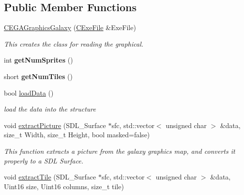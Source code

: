\subsection*{Public Member Functions}
\begin{DoxyCompactItemize}
\item 
\hyperlink{classgalaxy_1_1_c_e_g_a_graphics_galaxy_a76b6bfdad3e6a79bd32a8d588b138bde}{CEGAGraphicsGalaxy} (\hyperlink{class_c_exe_file}{CExeFile} \&ExeFile)
\begin{DoxyCompactList}\small\item\em This creates the class for reading the graphical. \item\end{DoxyCompactList}\item 
\hypertarget{classgalaxy_1_1_c_e_g_a_graphics_galaxy_a81f1beb7b177d2251f9ed48672e2a161}{
int {\bfseries getNumSprites} ()}
\label{classgalaxy_1_1_c_e_g_a_graphics_galaxy_a81f1beb7b177d2251f9ed48672e2a161}

\item 
\hypertarget{classgalaxy_1_1_c_e_g_a_graphics_galaxy_afb2635ebaf2e95319b118c25bca4e175}{
short {\bfseries getNumTiles} ()}
\label{classgalaxy_1_1_c_e_g_a_graphics_galaxy_afb2635ebaf2e95319b118c25bca4e175}

\item 
bool \hyperlink{classgalaxy_1_1_c_e_g_a_graphics_galaxy_ae104cc22b636a84daca1a205277e441f}{loadData} ()
\begin{DoxyCompactList}\small\item\em load the data into the structure \item\end{DoxyCompactList}\item 
\hypertarget{classgalaxy_1_1_c_e_g_a_graphics_galaxy_a4e82fa36e3542e5b3c8db3818a74d22b}{
void \hyperlink{classgalaxy_1_1_c_e_g_a_graphics_galaxy_a4e82fa36e3542e5b3c8db3818a74d22b}{extractPicture} (SDL\_\-Surface $\ast$sfc, std::vector$<$ unsigned char $>$ \&data, size\_\-t Width, size\_\-t Height, bool masked=false)}
\label{classgalaxy_1_1_c_e_g_a_graphics_galaxy_a4e82fa36e3542e5b3c8db3818a74d22b}

\begin{DoxyCompactList}\small\item\em This function extracts a picture from the galaxy graphics map, and converts it properly to a SDL Surface. \item\end{DoxyCompactList}\item 
\hypertarget{classgalaxy_1_1_c_e_g_a_graphics_galaxy_a0c02cd675034a87b620c0b1d5c59073c}{
void \hyperlink{classgalaxy_1_1_c_e_g_a_graphics_galaxy_a0c02cd675034a87b620c0b1d5c59073c}{extractTile} (SDL\_\-Surface $\ast$sfc, std::vector$<$ unsigned char $>$ \&data, Uint16 size, Uint16 columns, size\_\-t tile)}
\label{classgalaxy_1_1_c_e_g_a_graphics_galaxy_a0c02cd675034a87b620c0b1d5c59073c}


\end{DoxyCompactItemize}
